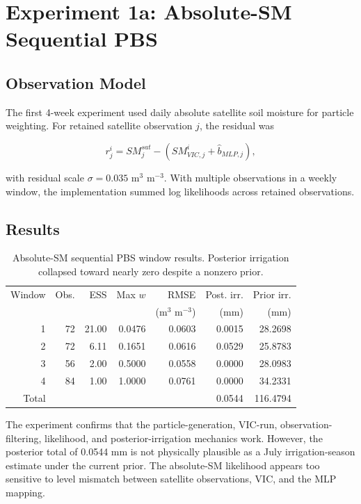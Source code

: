 \documentclass[11pt]{article}
\newcommand{\smunits}{m$^3$ m$^{-3}$}
\begin{document}
\section{Experiment 1a: Absolute-SM Sequential PBS}

\subsection{Observation Model}

The first 4-week experiment used daily absolute satellite soil moisture for particle weighting. For retained satellite observation $j$, the residual was

\begin{equation}
r^i_j = SM^{sat}_j - \left(SM^{i}_{VIC,j} + \widehat{b}_{MLP,j}\right),
\label{eq:absolute_resid}
\end{equation}

with residual scale $\sigma=0.035$ \smunits. With multiple observations in a weekly window, the implementation summed log likelihoods across retained observations.

\subsection{Results}

\begin{table}[H]
\centering
\caption{Absolute-SM sequential PBS window results. Posterior irrigation collapsed toward nearly zero despite a nonzero prior.}
\label{tab:absolute_results}
\begin{tabular}{rrrrrrr}
\toprule
Window & Obs. & ESS & Max $w$ & RMSE & Post. irr. & Prior irr. \\
 & & & & (\smunits) & (mm) & (mm) \\
\midrule
1 & 72 & 21.00 & 0.0476 & 0.0603 & 0.0015 & 28.2698 \\
2 & 72 & 6.11 & 0.1651 & 0.0616 & 0.0529 & 25.8783 \\
3 & 56 & 2.00 & 0.5000 & 0.0558 & 0.0000 & 28.0983 \\
4 & 84 & 1.00 & 1.0000 & 0.0761 & 0.0000 & 34.2331 \\
\midrule
Total & & & & & 0.0544 & 116.4794 \\
\bottomrule
\end{tabular}
\end{table}

The experiment confirms that the particle-generation, VIC-run, observation-filtering, likelihood, and posterior-irrigation mechanics work. However, the posterior total of 0.0544 mm is not physically plausible as a July irrigation-season estimate under the current prior. The absolute-SM likelihood appears too sensitive to level mismatch between satellite observations, VIC, and the MLP mapping.
\end{document}
